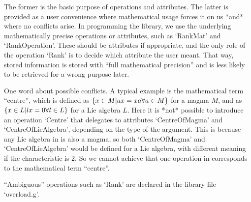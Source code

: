 The former is the basic purpose of operations and attributes.
The latter is provided as a user convenience where mathematical usage
forces it on us *and* where no conflicts arise.
In programming the library, we use the underlying mathematically
precise operations or attributes, such as `RankMat' and
`RankOperation'.
These should be attributes if appropriate, and the only role of the
operation `Rank' is to decide which attribute the user meant.
That way, stored information is stored with ``full mathematical precision''
and is less likely to be retrieved for a wrong purpose later.

One word about possible conflicts.
A typical example is the mathematical term ``centre'',
which is defined as $\{ x \in M | a \* x = x \* a \forall a \in M \}$
for a magma $M$, and as $\{ x \in L | l \* x = 0 \forall l \in L \}$
for a Lie algebra $L$.
Here it is *not* possible to introduce an operation `Centre' that
delegates to attributes `CentreOfMagma' and `CentreOfLieAlgebra',
depending on the type of the argument.
This is because any Lie algebra in {\GAP} is also a magma,
so both `CentreOfMagma' and `CentreOfLieAlgebra' would be defined
for a Lie algebra, with different meaning if the characteristic is $2$.
So we cannot achieve that one operation in {\GAP} corresponds to
the mathematical term ``centre''.

``Ambiguous'' operations such as `Rank' are declared in the library file
`overload.g'.



